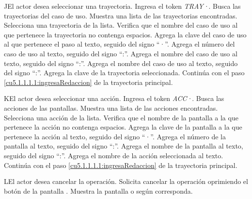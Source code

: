  \begin{UCtrayectoriaA}{J}{El actor desea seleccionar una trayectoria.}
 	\UCpaso[\UCactor] Ingresa el token {\it TRAY·}.
	\UCpaso[\UCsist] Busca las trayectorias del caso de uso.
  	\UCpaso[\UCsist] Muestra una lista de las trayectorias encontradas.
 	\UCpaso[\UCactor] Selecciona una trayectoria de la lista.
  	\UCpaso[\UCsist] Verifica que el nombre del caso de uso al que pertenece la trayectoria no contenga espacios. 
  	\UCpaso[\UCsist] Agrega la clave del caso de uso al que pertenece el paso al texto, seguido del signo ``·''.
  	\UCpaso[\UCsist] Agrega el número del caso de uso al texto, seguido del signo ``:''.
  	\UCpaso[\UCsist] Agrega el nombre del caso de uso al texto, seguido del signo ``:''.
  	\UCpaso[\UCsist] Agrega el nombre del caso de uso al texto, seguido del signo ``:''.
  	\UCpaso[\UCsist] Agrega la clave de la trayectoria seleccionada.
    \UCpaso[] Continúa con el paso \ref{cu5.1.1.1.1:ingresaRedaccion} de la trayectoria principal.
 \end{UCtrayectoriaA}
 \begin{UCtrayectoriaA}{K}{El actor desea seleccionar una acción.}
 	\UCpaso[\UCactor] Ingresa el token {\it ACC·}.
	\UCpaso[\UCsist] Busca las acciones de las pantallas.
  	\UCpaso[\UCsist] Muestra una lista de las acciones encontradas.
 	\UCpaso[\UCactor] Selecciona una acción de la lista.
  	\UCpaso[\UCsist] Verifica que el nombre de la pantalla a la que pertenece la acción no contenga espacios. 
  	\UCpaso[\UCsist] Agrega la clave de la pantalla a la que pertenece la acción al texto, seguido del signo ``·''.
  	\UCpaso[\UCsist] Agrega el número de la pantalla al texto, seguido del signo ``:''.
  	\UCpaso[\UCsist] Agrega el nombre de la pantalla al texto, seguido del signo ``:''.
  	\UCpaso[\UCsist] Agrega el nombre de la acción seleccionada al texto.
    \UCpaso[] Continúa con el paso \ref{cu5.1.1.1.1:ingresaRedaccion} de la trayectoria principal.
 \end{UCtrayectoriaA}

 \begin{UCtrayectoriaA}{L}{El actor desea cancelar la operación.}
    \UCpaso[\UCactor] Solicita cancelar la operación oprimiendo el botón  de la pantalla .
    \UCpaso[\UCsist] Muestra la pantalla  o  según corresponda.
 \end{UCtrayectoriaA}
 
